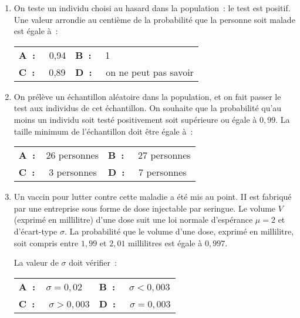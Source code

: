 \begin{enumerate}
     \item On teste un individu choisi au hasard dans la population~: le test est positif. Une valeur arrondie au centième de la probabilité que la personne soit malade est égale à~:
     \medbreak
     \begin{tabularx}{\linewidth}{*{2}{X}}%
          \textbf{A~:~~} 0,94 &\textbf{B~:~~} 1 \\ 
          \textbf{C~:~~} 0,89 &\textbf{D~:~~} on ne peut pas savoir
     \end{tabularx}
     \medbreak
     \item  On prélève un échantillon aléatoire dans la population, et on fait passer le test aux individus de cet échantillon. On souhaite que la probabilité qu'au moins un individu soit testé positivement soit supérieure ou égale à $0,99$. La taille minimum de l'échantillon doit être égale à~:
     \medbreak
     \begin{tabularx}{\linewidth}{*{2}{X}}%
          \textbf{A~:~~}26 personnes &\textbf{B~:~~} 27 personnes \\ 
          \textbf{C~:~~} 3 personnes &\textbf{D~:~~} 7 personnes
     \end{tabularx}
     \medbreak
     \item  Un vaccin pour lutter contre cette maladie a été mis au point. II est fabriqué par une entreprise sous forme de dose injectable par seringue. Le volume $V$ (exprimé en millilitre) d'une dose suit une loi normale d'espérance $\mu = 2$ et d'écart-type $\sigma$. La probabilité que le volume d'une dose, exprimé en millilitre, soit compris entre $1,99$ et $2,01$ millilitres est égale à $0,997$.
     \par
     La valeur de $\sigma$ doit vérifier~:
     \medbreak
     \begin{tabularx}{\linewidth}{*{2}{X}}%
          \textbf{A~:~~}$\sigma = 0,02$ &\textbf{B~:~~} $\sigma < 0,003$ \\ 
          \textbf{C~:~~} $\sigma > 0,003$ &\textbf{D~:~~} $\sigma = 0,003$
     \end{tabularx}
     \medbreak
\end{enumerate}
\bigbreak
{}
\medbreak
